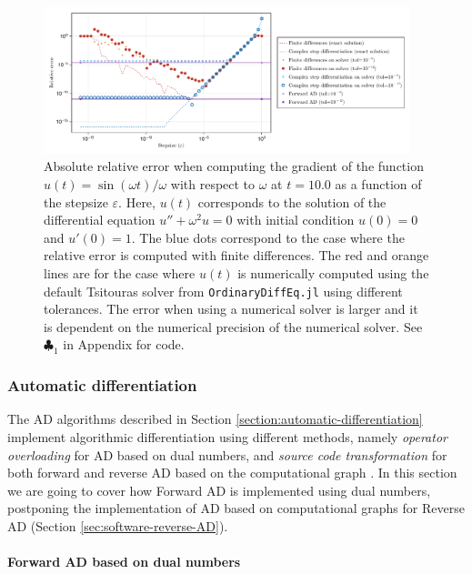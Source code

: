 \begin{figure}[tb]
    \centering
    \includegraphics[width=0.95\textwidth]{figures/direct_derivatives.pdf}
    \caption{Absolute relative error when computing the gradient of the function $u(t) = \sin (\omega t)/\omega$ with respect to $\omega$ at $t=10.0$ as a function of the stepsize $\varepsilon$. Here, $u(t)$ corresponds to the solution of the differential equation $u'' + \omega^2 u = 0$ with initial condition $u(0)=0$ and $u'(0)=1$. The blue dots correspond to the case where the relative error is computed with finite differences. The red and orange lines are for the case where $u(t)$ is numerically computed using the default Tsitouras solver \cite{Tsitouras_2011} from \texttt{OrdinaryDiffEq.jl} using different tolerances. The error when using a numerical solver is larger and it is dependent on the numerical precision of the numerical solver. See $\clubsuit_1$ in Appendix for code. }
    \label{fig:direct-methods}
\end{figure}

\subsubsection{Automatic differentiation}

The AD algorithms described in Section \ref{section:automatic-differentiation} implement algorithmic differentiation using different methods, namely \textit{operator overloading} for AD based on dual numbers, and \textit{source code transformation} for both forward and reverse AD based on the computational graph \cite{martins2001connection}.
In this section we are going to cover how Forward AD is implemented using dual numbers, postponing the implementation of AD based on computational graphs for Reverse AD (Section \ref{sec:software-reverse-AD}). 

\paragraph{Forward AD based on dual numbers}
\label{section:software-Forward-AD}

